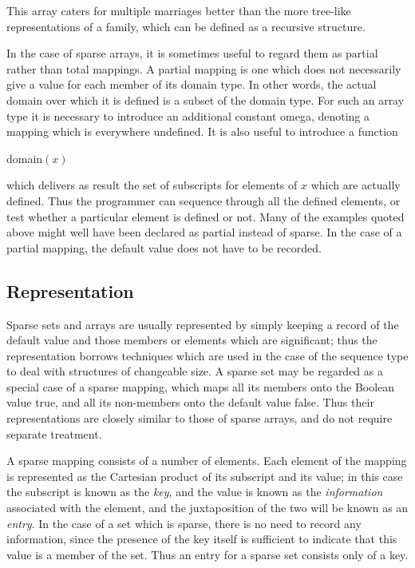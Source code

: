 \documentclass[twoside,11pt]{book}
\begin{document}
\noindent
This array caters for multiple marriages better than the more tree-like representations of a family, which can be defined as a recursive structure.

In the case of sparse arrays, it is sometimes useful to regard them as partial rather than total mappings. A partial mapping is one which does not necessarily give a value for each member of its domain type. In other words, the actual domain over which it is defined is a subset of the domain type. For such an array type it is necessary to introduce an additional constant omega, denoting a mapping which is everywhere undefined. It is also useful to introduce a function

\quad domain$(x)$

\noindent
which delivers as result the set of subscripts for elements of $x$ which are actually defined. Thus the programmer can sequence through all the defined elements, or test whether a particular element is defined or not. Many of the examples quoted above might well have been declared as partial instead of sparse. In the case of a partial mapping, the default value does not have to be recorded.

\subsection{Representation}

\noindent
Sparse sets and arrays are usually represented by simply keeping a record of the default value and those members or elements which are significant; thus the representation borrows techniques which are used in the case of the sequence type to deal with structures of changeable size. A sparse set may be regarded as a special case of a sparse mapping, which maps all its members onto the Boolean value true, and all its non-members onto the default value false. Thus their representations are closely similar to those of sparse arrays, and do not require separate treatment.

A sparse mapping consists of a number of elements. Each element of the mapping is represented as the Cartesian product of its subscript and its value; in this case the subscript is known as the \textit{key}, and the value is known as the \textit{information} associated with the element, and the juxtaposition of the two will be known as an \textit{entry}. In the case of a set which is sparse, there is no need to record any information, since the presence of the key itself is sufficient to indicate that this value is a member of the set. Thus an entry for a sparse set consists only of a key.
\end{document}
